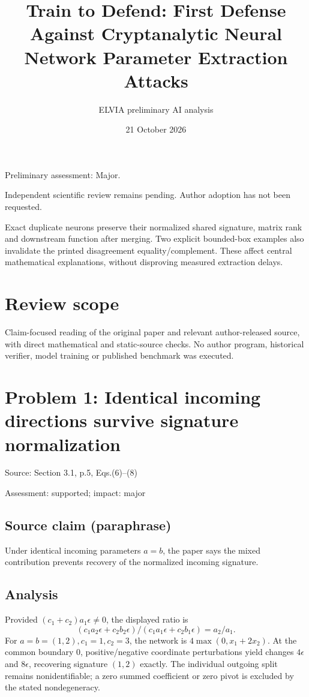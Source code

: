 \documentclass[11pt]{article}
\begin{document}
\title{Train to Defend: First Defense Against Cryptanalytic Neural Network Parameter Extraction Attacks}

\author{ELVIA preliminary AI analysis}\date{21 October 2026}\maketitle

Preliminary assessment: Major.\par

Independent scientific review remains pending. Author adoption has not been requested.

Exact duplicate neurons preserve their normalized shared signature, matrix rank and downstream function after merging. Two explicit bounded-box examples also invalidate the printed disagreement equality/complement. These affect central mathematical explanations, without disproving measured extraction delays.

\section*{Review scope}

Claim-focused reading of the original paper and relevant author-released source, with direct mathematical and static-source checks. No author program, historical verifier, model training or published benchmark was executed.

\section*{Problem 1: Identical incoming directions survive signature normalization}

Source: Section 3.1, p.5, Eqs.(6)–(8)

Assessment: supported; impact: major

\subsection*{Source claim (paraphrase)}

Under identical incoming parameters \(a=b\), the paper says the mixed contribution prevents recovery of the normalized incoming signature.

\subsection*{Analysis}

Provided \((c_1+c_2)a_1\epsilon\ne0\), the displayed ratio is \[(c_1a_2\epsilon+c_2b_2\epsilon)/(c_1a_1\epsilon+c_2b_1\epsilon)=a_2/a_1.\] For \(a=b=(1,2),c_1=1,c_2=3\), the network is \(4\max(0,x_1+2x_2)\). At the common boundary \(0\), positive/negative coordinate perturbations yield changes \(4\epsilon\) and \(8\epsilon\), recovering signature \((1,2)\) exactly. The individual outgoing split remains nonidentifiable; a zero summed coefficient or zero pivot is excluded by the stated nondegeneracy.
\end{document}
